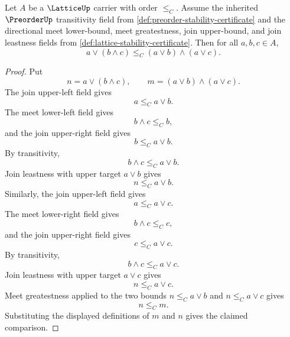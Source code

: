 \begin{lemma}
\label{lem:lattice-join-meet-lower-comparison-from-directional-bounds}
Let $A$ be a $\LatticeUp$ carrier with order $\le_C$. Assume the inherited $\PreorderUp$ transitivity field from \autoref{def:preorder-stability-certificate} and the directional meet lower-bound, meet greatestness, join upper-bound, and join leastness fields from \autoref{def:lattice-stability-certificate}. Then for all $a,b,c\in A$,
$$
a\vee(b\wedge c)\le_C (a\vee b)\wedge(a\vee c).
$$
\end{lemma}
\begin{proof}
Put
$$
n=a\vee(b\wedge c),
\qquad
m=(a\vee b)\wedge(a\vee c).
$$
The join upper-left field gives
$$
a\le_C a\vee b.
$$
The meet lower-left field gives
$$
b\wedge c\le_C b,
$$
and the join upper-right field gives
$$
b\le_C a\vee b.
$$
By transitivity,
$$
b\wedge c\le_C a\vee b.
$$
Join leastness with upper target $a\vee b$ gives
$$
n\le_C a\vee b.
$$
Similarly, the join upper-left field gives
$$
a\le_C a\vee c.
$$
The meet lower-right field gives
$$
b\wedge c\le_C c,
$$
and the join upper-right field gives
$$
c\le_C a\vee c.
$$
By transitivity,
$$
b\wedge c\le_C a\vee c.
$$
Join leastness with upper target $a\vee c$ gives
$$
n\le_C a\vee c.
$$
Meet greatestness applied to the two bounds $n\le_C a\vee b$ and $n\le_C a\vee c$ gives
$$
n\le_C m.
$$
Substituting the displayed definitions of $m$ and $n$ gives the claimed comparison.
\end{proof}

